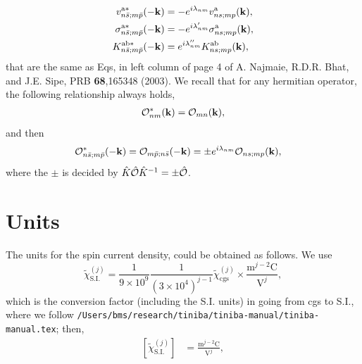 \documentclass[floatfix,prb,aps,superscriptaddress,11pt]{revtex4}
\begin{document}
\begin{align}\label{en.41} 
v^{\mathrm{a}*}_{n\bar s;m\bar p}(-\mathbf{k}) 
&=- 
e^{i\lambda_{nm}} 
v^{\mathrm{a}}_{ns;mp}(\mathbf{k}) 
,
\nonumber\\
\sigma^{\mathrm{a}*}_{n\bar s;m\bar p}(-\mathbf{k}) 
&=- 
e^{i\lambda'_{nm}}
\sigma^{\mathrm{a}}_{ns;mp}(\mathbf{k}) 
,
\nonumber\\ 
K^{\mathrm{a}\mathrm{b}*}_{n\bar s;m\bar p}(-\mathbf{k}) 
&= 
e^{i\lambda''_{nm}} 
K^{\mathrm{a}\mathrm{b}}_{ns;mp}(\mathbf{k}) 
,
\end{align}  
that are the same as Eqs, in left column of page 4 of A. Najmaie,
R.D.R. Bhat, and J.E. Sipe, PRB {\bf 68},165348 (2003).
We recall that for any hermitian operator, the following relationship
always holds,
\begin{align}\label{e.42}
{\cal O}^*_{nm}(\mathbf{k}) 
=
{\cal O}_{mn}(\mathbf{k}) 
,
\end{align}
and then
\begin{align}\label{en.43}
{\cal O}^*_{n\bar s;m\bar p}(-\mathbf{k}) 
={\cal O}_{m\bar p;n\bar s}(-\mathbf{k}) 
&=\pm
e^{i\lambda_{nm}}
{\cal O}_{ns;mp}(\mathbf{k}) 
,
\end{align} 
where the $\pm$ is decided by 
$\hat K \hat{{\cal O}} \hat K^{-1}=\pm\hat{{\cal O}}$. 

\section{Units}
The units for the  spin current density, could be obtained as
follows. We use
\begin{equation}\label{si}
\tilde\chi_{\mathrm{S.I.}}^{(j)}=
\frac{1}{9\times 10^9}\frac{1}{(3\times 
 10^4)^{j-1}}\tilde\chi^{(j)}_{\mathrm{cgs}} \times 
\frac{\text{m}^{j-2}\text{C}}{\text{V}^j}
,
\end{equation} 
which is the conversion factor (including the S.I. units) in going from cgs 
to S.I., where we follow 
\verb=/Users/bms/research/tiniba/tiniba-manual/tiniba-manual.tex=;
 then,
\begin{align}\label{u.691}
[\tilde\chi^{(j)}_{\mathrm{S.I.}}]
&=
\frac{\text{m}^{j-2}\text{C}}{\text{V}^j}
,
\end{align}
\end{document}

